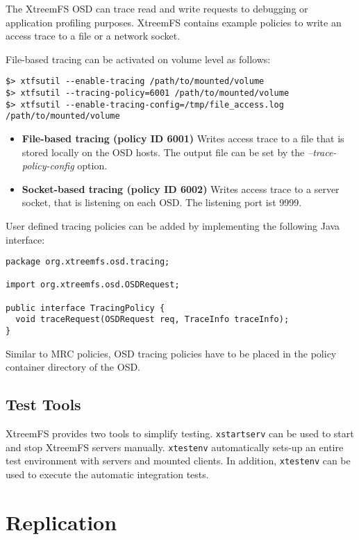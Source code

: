 \documentclass[a4paper,10pt]{book}
\begin{document}
The XtreemFS OSD can trace read and write requests to debugging or application
profiling purposes. XtreemFS contains example policies to write an access trace to a
file or a network socket.

File-based tracing can be activated on volume level as follows:

\begin{verbatim}
$> xtfsutil --enable-tracing /path/to/mounted/volume
$> xtfsutil --tracing-policy=6001 /path/to/mounted/volume
$> xtfsutil --enable-tracing-config=/tmp/file_access.log /path/to/mounted/volume
\end{verbatim}

\begin{itemize}
  \item \textbf{File-based tracing (policy ID 6001)} Writes access trace to a
    file that is stored locally on the OSD hosts. The output file can be set by
    the \emph{--trace-policy-config} option.
  \item \textbf{Socket-based tracing (policy ID 6002)} Writes access trace to a
    server socket, that is listening on each OSD. The listening port ist 9999.
\end{itemize}

User defined tracing policies can be added by implementing the following Java
interface:

\begin{verbatim}
package org.xtreemfs.osd.tracing;

import org.xtreemfs.osd.OSDRequest;

public interface TracingPolicy {
  void traceRequest(OSDRequest req, TraceInfo traceInfo);
}
\end{verbatim}

Similar to MRC policies, OSD tracing policies have to be placed in the policy
container directory of the OSD.

\section{Test Tools}
XtreemFS provides two tools to simplify testing. \texttt{xstartserv} can be used to start and stop XtreemFS servers manually. \texttt{xtestenv} automatically sets-up an entire test environment with servers and mounted clients. In addition, \texttt{xtestenv} can be used to execute the automatic integration tests.

\chapter{Replication}
\end{document}
